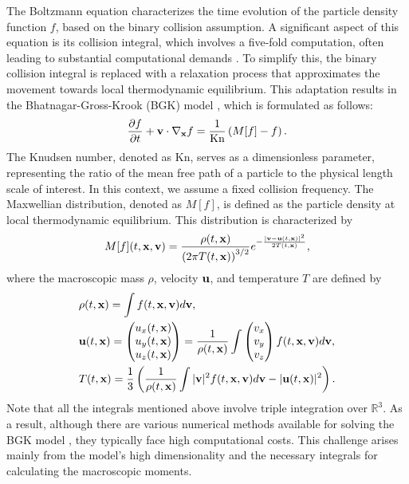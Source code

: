 \documentclass[preprint,12pt]{elsarticle}
\begin{document}
The Boltzmann equation characterizes the time evolution of the particle density function $f$, based on the binary collision assumption.
A significant aspect of this equation is its collision integral, which involves a five-fold computation, often leading to substantial computational demands \cite{dimarco2014numerical}. To simplify this, the binary collision integral is replaced with a relaxation process that approximates the movement towards local thermodynamic equilibrium.
This adaptation results in the Bhatnagar-Gross-Krook (BGK) model \cite{bhatnagar1954model}, which is formulated as follows: 
\begin{equation}\label{eq:bgk}
    \frac{\partial f}{\partial t} + {\bf v} \cdot \nabla_{\bf x} f 
    = \frac{1}{\mathrm{Kn}} \left( M[f] - f\right).
\end{equation}
The Knudsen number, denoted as $\mathrm{Kn}$, serves as a dimensionless parameter, representing the ratio of the mean free path of a particle to the physical length scale of interest. In this context, we assume a fixed collision frequency. The Maxwellian distribution, denoted as $M[f]$, is defined as the particle density at local thermodynamic equilibrium. This distribution is characterized by
\[
    M[f](t,{\bf x,v}) = \frac{\rho(t,{\bf x})}{\left(2\pi T(t,{\bf x})\right)^{3/2}}e^{-\frac{|{\bf v} - {\bf u}(t,{\bf x})|^2}{2T(t,{\bf x})}},
\]
where the macroscopic mass $\rho$, velocity ${\bf u}$, and temperature $T$ are defined by
\begin{align*}
    &\rho(t,{\bf x}) = \int f(t,{\bf x, v}) d{\bf v}, \\
    &{\bf u}(t,{\bf x})
    =
    \begin{pmatrix}
      u_x(t,{\bf x}) \\ u_y(t,{\bf x}) \\ u_z(t,{\bf x})  
    \end{pmatrix}
    = \frac{1}{\rho(t,{\bf x})}\int
    \begin{pmatrix}
    v_x \\ v_y \\ v_z    
    \end{pmatrix}
    f(t,{\bf x, v}) d{\bf v}, \\
    &T(t,{\bf x})
    = \frac{1}{3}\left(
    \frac{1}{\rho(t,{\bf x})}\int |{\bf v}|^2 f(t,{\bf x, v}) d{\bf v}- 
    |{\bf u }(t,{\bf x})|^2 
    \right).
\end{align*}
Note that all the integrals mentioned above involve triple integration over $\mathbb{R}^3$.
As a result, although there are various numerical methods available for solving the BGK model \cite{mieussens2000discrete,bennoune2008uniformly,pieraccini2007implicit,cho2021conservative2,ding2021semi,xiong2015high,boscheri2020high, gamba2019micro}, they typically face high computational costs.
This challenge arises mainly from the model's high dimensionality and the necessary integrals for calculating the macroscopic moments.
\end{document}
